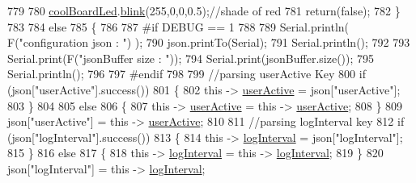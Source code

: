\begin{DoxyCode}
779     
780             \hyperlink{class_cool_board_a1b1d3c684a5baa56b08486e192fd8e97}{coolBoardLed}.\hyperlink{class_cool_board_led_a96e1ea13003eee34c9dbcef340404426}{blink}(255,0,0,0.5);\textcolor{comment}{//shade of red     }
781             \textcolor{keywordflow}{return}(\textcolor{keyword}{false});
782         \}
783 
784         \textcolor{keywordflow}{else}
785         \{   
786         
787 \textcolor{preprocessor}{        #if DEBUG == 1}
788             
789             Serial.println( F(\textcolor{stringliteral}{"configuration json : "}) );
790             json.printTo(Serial);
791             Serial.println();
792             
793             Serial.print(F(\textcolor{stringliteral}{"jsonBuffer size : "}));
794             Serial.print(jsonBuffer.size());
795             Serial.println();
796 
797 \textcolor{preprocessor}{        #endif}
798             
799             \textcolor{comment}{//parsing userActive Key}
800             \textcolor{keywordflow}{if} (json[\textcolor{stringliteral}{"userActive"}].success())
801             \{
802                 \textcolor{keyword}{this} -> \hyperlink{class_cool_board_a6395459131d6889a3005f79c7a35e964}{userActive} = json[\textcolor{stringliteral}{"userActive"}];
803             \}
804 
805             \textcolor{keywordflow}{else}
806             \{
807                 \textcolor{keyword}{this} -> \hyperlink{class_cool_board_a6395459131d6889a3005f79c7a35e964}{userActive} = \textcolor{keyword}{this} -> \hyperlink{class_cool_board_a6395459131d6889a3005f79c7a35e964}{userActive};
808             \}
809             json[\textcolor{stringliteral}{"userActive"}] = \textcolor{keyword}{this} -> \hyperlink{class_cool_board_a6395459131d6889a3005f79c7a35e964}{userActive};
810 
811             \textcolor{comment}{//parsing logInterval key}
812             \textcolor{keywordflow}{if} (json[\textcolor{stringliteral}{"logInterval"}].success())
813             \{
814                 \textcolor{keyword}{this} -> \hyperlink{class_cool_board_a84bc94413b64973e4aba8c467c97006c}{logInterval} = json[\textcolor{stringliteral}{"logInterval"}];
815             \}
816             \textcolor{keywordflow}{else}
817             \{
818                 \textcolor{keyword}{this} -> \hyperlink{class_cool_board_a84bc94413b64973e4aba8c467c97006c}{logInterval} = \textcolor{keyword}{this} -> \hyperlink{class_cool_board_a84bc94413b64973e4aba8c467c97006c}{logInterval};
819             \}
820             json[\textcolor{stringliteral}{"logInterval"}] = \textcolor{keyword}{this} -> \hyperlink{class_cool_board_a84bc94413b64973e4aba8c467c97006c}{logInterval};

\end{DoxyCode}
